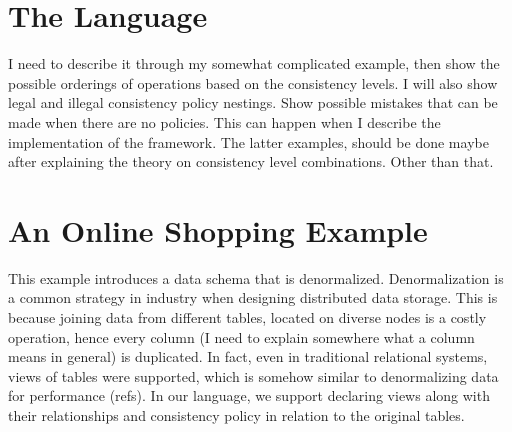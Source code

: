 

\section{The  Language}

I need to describe it through my somewhat complicated example, then show the
possible orderings of operations based on the consistency levels. I will also
show legal and illegal consistency policy nestings. Show possible mistakes that
can be made when there are no policies. This can happen when I describe the
implementation of the framework. The latter examples, should
be done maybe after explaining the theory on consistency level combinations.
Other than that. 

\section{An Online Shopping Example}
This example introduces a data schema that is denormalized. Denormalization is a
common strategy in industry when designing distributed data storage. This is
because joining data from different tables, located on diverse nodes is a costly
operation, hence every column (I need to explain somewhere what a column means
in general) is duplicated. In fact, even in traditional relational systems,
views of tables were supported, which is somehow similar to denormalizing data
for performance (refs). In our language, we support declaring views along with
their relationships and consistency policy in relation to the original tables.

